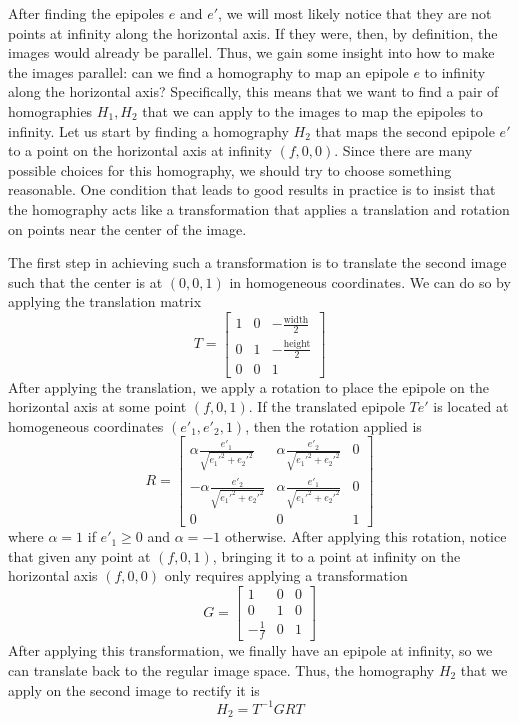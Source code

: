 \documentclass[a4paper, 12pt]{article}
\begin{document}
After finding the epipoles $e$ and $e'$, we will most likely notice that they are not points at infinity along the horizontal axis. If they were, then, by definition, the images would already be parallel. Thus, we gain some insight into how to make the images parallel: can we find a homography to map an epipole $e$ to infinity along the horizontal axis? Specifically, this means that we want to find a pair of homographies $H_1, H_2$ that we can apply to the images to map the epipoles to infinity. Let us start by finding a homography $H_2$ that maps the second epipole $e'$ to a  point on the horizontal axis at infinity $(f,0,0)$. Since there are many possible choices for this homography, we should try to choose something reasonable. One condition that leads to good results in practice is to insist that the homography acts like a transformation that applies a translation and rotation on points near the center of the image. 

The first step in achieving such a transformation is to translate the second image such that the center is at $(0,0,1)$ in homogeneous coordinates. We can do so by applying the translation matrix
\begin{equation}
    T = \begin{bmatrix}
    1&0&-\frac{\mathrm{width}}{2}\\0&1&-\frac{\mathrm{height}}{2}\\ 0 &0 &1
    \end{bmatrix}
\end{equation}
After applying the translation, we apply a rotation to place the epipole on the horizontal axis at some point $(f,0,1)$. If the translated epipole $Te'$ is located at homogeneous coordinates $(e'_1, e'_2, 1)$, then the rotation applied is
\begin{equation}
    R = 
    \begin{bmatrix}
        \alpha\frac{e'_1}{\sqrt{e_1'^2+e_2'^2}} & \alpha\frac{e'_2}{\sqrt{e_1'^2+e_2'^2}} & 0 \\ -\alpha\frac{e'_2}{\sqrt{e_1'^2+e_2'^2}} &\alpha \frac{e'_1}{\sqrt{e_1'^2+e_2'^2}} & 0\\ 0&0&1
    \end{bmatrix}
\end{equation}
where $\alpha=1$ if $e'_1\geq 0$ and $\alpha=-1$ otherwise. After applying this rotation, notice that given any point at $(f,0,1)$, bringing it to a point at infinity on the horizontal axis $(f,0,0)$ only requires applying a transformation
\begin{equation}
    G =
    \begin{bmatrix}
    1 & 0 &0 \\ 0 & 1 & 0 \\ -\frac{1}{f} & 0 & 1
    \end{bmatrix}
\end{equation}
After applying this transformation, we finally have an epipole at infinity, so we can translate back to the regular image space. Thus, the homography $H_2$ that we apply on the second image to rectify it is 
\begin{equation}
    H_2 = T^{-1}GRT 
\end{equation}
\end{document}
